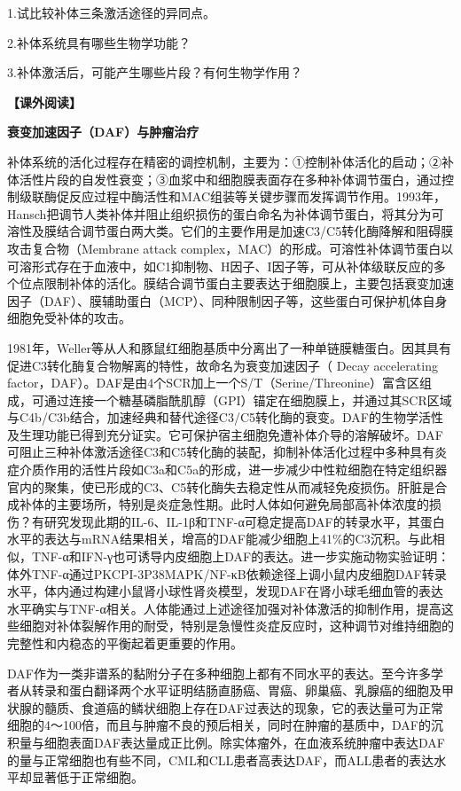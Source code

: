 1.试比较补体三条激活途径的异同点。

2.补体系统具有哪些生物学功能？

3.补体激活后，可能产生哪些片段？有何生物学作用？

\noindent\textbf{【课外阅读】}

\begin{center}
  \textbf{\Large 衰变加速因子（DAF）与肿瘤治疗}
\end{center}

补体系统的活化过程存在精密的调控机制，主要为：①控制补体活化的启动；②补体活性片段的自发性衰变；③血浆中和细胞膜表面存在多种补体调节蛋白，通过控制级联酶促反应过程中酶活性和MAC组装等关键步骤而发挥调节作用。1993年，Hansch把调节人类补体并阻止组织损伤的蛋白命名为补体调节蛋白，将其分为可溶性及膜结合调节蛋白两大类。它们的主要作用是加速C3/C5转化酶降解和阻碍膜攻击复合物（Membrane
attack
complex，MAC）的形成。可溶性补体调节蛋白以可溶形式存在于血液中，如C1抑制物、H因子、I因子等，可从补体级联反应的多个位点限制补体的活化。膜结合调节蛋白主要表达于细胞膜上，主要包括衰变加速因子（DAF）、膜辅助蛋白（MCP）、同种限制因子等，这些蛋白可保护机体自身细胞免受补体的攻击。

1981年，Weller等从人和豚鼠红细胞基质中分离出了一种单链膜糖蛋白。因其具有促进C3转化酶复合物解离的特性，故命名为衰变加速因子（
Decay accelerating
factor，DAF）。DAF是由4个SCR加上一个S/T（Serine/Threonine）富含区组成，可通过连接一个糖基磷脂酰肌醇（GPI）锚定在细胞膜上，并通过其SCR区域与C4b/C3b结合，加速经典和替代途径C3/C5转化酶的衰变。DAF的生物学活性及生理功能已得到充分证实。它可保护宿主细胞免遭补体介导的溶解破坏。DAF可阻止三种补体激活途径C3和C5转化酶的装配，抑制补体活化过程中多种具有炎症介质作用的活性片段如C3a和C5a的形成，进一步减少中性粒细胞在特定组织器官内的聚集，使已形成的C3、C5转化酶失去稳定性从而减轻免疫损伤。肝脏是合成补体的主要场所，特别是炎症急性期。此时人体如何避免局部高补体浓度的损伤？有研究发现此期的IL-6、IL-1β和TNF-α可稳定提高DAF的转录水平，其蛋白水平的表达与mRNA结果相关，增高的DAF能减少细胞上41\%的C3沉积。与此相似，TNF-α和IFN-γ也可诱导内皮细胞上DAF的表达。进一步实施动物实验证明：体外TNF-α通过PKCPI-3P38MAPK/NF-κB依赖途径上调小鼠内皮细胞DAF转录水平，体内通过构建小鼠肾小球性肾炎模型，发现DAF在肾小球毛细血管的表达水平确实与TNF-α相关。人体能通过上述途径加强对补体激活的抑制作用，提高这些细胞对补体裂解作用的耐受，特别是急慢性炎症反应时，这种调节对维持细胞的完整性和内稳态的平衡起着更重要的作用。

DAF作为一类非谱系的黏附分子在多种细胞上都有不同水平的表达。至今许多学者从转录和蛋白翻译两个水平证明结肠直肠癌、胃癌、卵巢癌、乳腺癌的细胞及甲状腺的髓质、食道癌的鳞状细胞上存在DAF过表达的现象，它的表达量可为正常细胞的4～100倍，而且与肿瘤不良的预后相关，同时在肿瘤的基质中，DAF的沉积量与细胞表面DAF表达量成正比例。除实体瘤外，在血液系统肿瘤中表达DAF的量与正常细胞也有些不同，CML和CLL患者高表达DAF，而ALL患者的表达水平却显著低于正常细胞。

